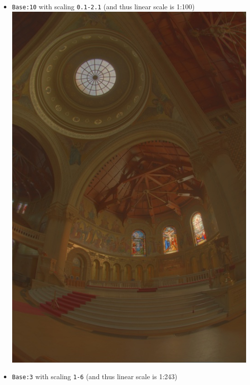 \documentclass{article}
\begin{document}
    \begin{itemize}
        \item \texttt{Base:10} with scaling \texttt{0.1-2.1} (and thus linear scale is 1:100) \\
        \includegraphics[scale=.25]{./data/1/lgscl/b10.jpg}
        \item \texttt{Base:3} with scaling \texttt{1-6} (and thus linear scale is 1:243) \\

\end{itemize}
\end{document}
